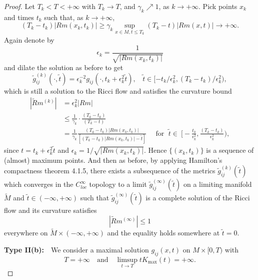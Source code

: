 \begin{proof}
Let $T_k<T<+\infty$ with $T_k\rightarrow T$, and $\gamma_k\nearrow
1$, as $k\rightarrow +\infty$. Pick points $x_k$ and times $t_k$
such that, as $k\rightarrow +\infty$,
$$
(T_k-t_k)|Rm(x_k,t_k)|\geq \gamma_k \sup_{x\in M, t\leq
T_k}(T_k-t)|Rm(x,t)|\rightarrow +\infty.
$$
Again denote by
$$
\epsilon_k=\frac{1}{\sqrt{|Rm(x_k,t_k)|}}
$$
and dilate the solution as before to get
$$
\tilde{g}_{ij}^{(k)}(\cdot,\tilde{t})
=\epsilon_k^{-2}g_{ij}(\cdot,t_k+\epsilon_k^2\tilde{t}),\ \ \ \
\tilde{t}\in [-t_k/\epsilon_k^2,(T_k-t_k)/\epsilon_k^2),
$$
which is still a solution to the Ricci flow and satisfies the
curvature bound
\begin{align*}
|\tilde{R}m^{(k)}|&  = \epsilon_k^2|Rm| \\
&  \leq\frac{1}{\gamma_k}\cdot \frac{(T_k-t_k)}{(T_k-t)}\\
& =\frac{1}{\gamma_k}\frac{(T_k-t_k)|Rm(x_k,t_k)|}{[(T_k-t_k)|
Rm(x_k,t_k)|-\tilde{t}]}\quad \mbox{ for } \; \tilde{t}\in\
\bigg[-\frac{t_k}{\epsilon_k^2},\frac{(T_k-t_k)}{\epsilon_k^2}\bigg),
\end{align*}
since $t=t_k+\epsilon_k^2\tilde{t}$ and
$\epsilon_k=1/\sqrt{|Rm(x_k,t_k)|}$. Hence $\{(x_k,t_k)\}$ is a
sequence of (almost) maximum points. And then as before, by
applying Hamilton's compactness theorem 4.1.5, there exists a
subsequence of the metrics $\tilde{g}_{ij}^{(k)}(\tilde{t})$ which
converges in the $C_{loc}^{\infty}$ topology to a limit
$\tilde{g}_{ij}^{(\infty)}(\tilde {t})$ on a limiting manifold
$\tilde{M}$ and $\tilde{t}\in(-\infty,+\infty)$ such that
$\tilde{g}_{ij}^{(\infty)}(\tilde {t})$ is a complete solution of
the Ricci flow and its curvature satisfies
$$
|\tilde{R}m^{(\infty)}|\leq 1
$$
everywhere on $\tilde{M}\times (-\infty,+\infty)$ and the equality
holds somewhere at $\tilde{t}=0$.

\medskip
{\bf Type II(b):}\ \ We consider a maximal
solution $g_{ij}(x,t)$ on $M\times [0,T)$ with
$$
T=+\infty\quad \text{and} \quad \limsup_{t\rightarrow
T}tK_{\max}(t)=+\infty.
$$


\end{proof}
